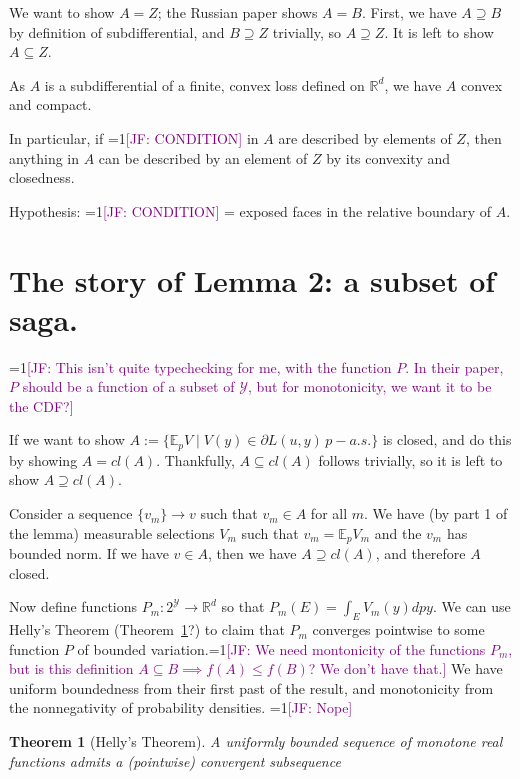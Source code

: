 \documentclass{article}
\newcommand{\Comments}{1}
\newcommand{\mynote}[2]{\ifnum\Comments=1\textcolor{#1}{#2}\fi}
\newcommand{\jessie}[1]{\mynote{purple}{[JF: #1]}}
\newcommand{\reals}{\mathbb{R}}
\newcommand{\E}{\mathbb{E}}
\newcommand{\Y}{\mathcal{Y}}
\newtheorem{theorem}{Theorem}
\begin{document}
We want to show $A = Z$; the Russian paper shows $A =B$.
First, we have $A \supseteq B$ by definition of subdifferential, and $B \supseteq Z$ trivially, so $A \supseteq Z$.
It is left to show $A \subseteq Z$.

As $A$ is a subdifferential of a finite, convex loss defined on $\reals^d$, we have $A$ convex and compact.

In particular, if \jessie{CONDITION} in $A$ are described by elements of $Z$, then anything in $A$ can be described by an element of $Z$ by its convexity and closedness.

Hypothesis: \jessie{CONDITION} = exposed faces in the relative boundary of $A$.

\section{The story of Lemma 2: a subset of saga.}

\jessie{This isn't quite typechecking for me, with the function $P$.  In their paper, $P$ should be a function of a subset of $\Y$, but for monotonicity, we want it to be the CDF?}

If we want to show $A := \{\E_p V \mid V(y) \in \partial L(u,y) \, p-a.s.\}$ is closed, and do this by showing $A = cl(A)$.  Thankfully, $A \subseteq cl(A)$ follows trivially, so it is left to show $A \supseteq cl(A)$.

Consider a sequence $\{v_m\} \to v$ such that $v_m \in A$ for all $m$.  We have (by part 1 of the lemma) measurable selections $V_m$ such that $v_m = \E_p V_m$ and the $v_m$ has bounded norm.
If we have $v \in A$, then we have $A \supseteq cl(A)$, and therefore $A$ closed.

Now define functions $P_m : 2^\Y \to \reals^d$ so that $P_m(E) = \int_E V_m(y) dpy$.  
We can use Helly's Theorem (Theorem~\ref{thm:helly}?) to claim that $P_m$ converges pointwise to some function $P$ of bounded variation.\jessie{We need montonicity of the functions $P_m$, but is this definition $A \subseteq B \implies f(A) \leq f(B)$? We don't have that.}
We have uniform boundedness from their first past of the result, and monotonicity from the nonnegativity of probability densities. \jessie{Nope}%

\begin{theorem}[Helly's Theorem]\label{thm:helly}
	A uniformly bounded sequence of monotone real functions admits a (pointwise) convergent subsequence
\end{theorem}
\end{document}

